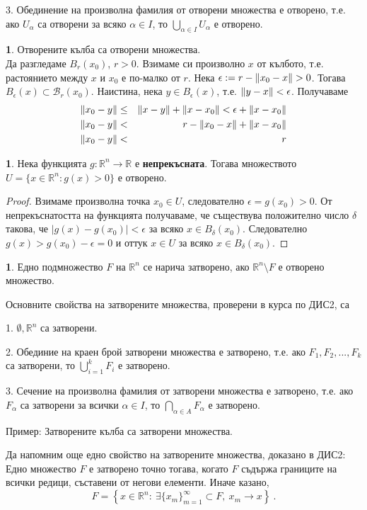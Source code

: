 \documentclass[11pt]{article}
\numberwithin{equation}{section}
\numberwithin{figure}{section}
\numberwithin{table}{section}
\theoremstyle{plain}
\theoremstyle{definition}
\newtheorem{defn}[thm]{\protect\definitionname}
\theoremstyle{remark}
\theoremstyle{definition}
\theoremstyle{remark}
\theoremstyle{plain}
\theoremstyle{definition}
\theoremstyle{definition}
\newtheorem{example}[thm]{\protect\examplename}
\theoremstyle{plain}
\theoremstyle{plain}
\theoremstyle{plain}
\theoremstyle{definition}
\theoremstyle{plain}
\providecommand{\definitionname}{Дефиниция}
\providecommand{\examplename}{Пример}
\DeclarePairedDelimiter\norm{\lVert}{\rVert}
\newcommand*{\B}{\mathcal{B}}
\newcommand*{\R}{\mathbb{R}}
\begin{document}
3. Обединение на произволна фамилия от отворени множества е отворено, т.е. ако $U_\alpha$ са отворени за всяко $\alpha \in I$, то $\bigcup _{\alpha \in I} U_\alpha$ е отворено.

\begin{example}
Отворените кълба са отворени множества.\\
Да разгледаме $B_r(x_0)$, $r>0$. Взимаме си произволно $x$ от кълбото, т.е. растоянието между $x$ и $x_0$ е по-малко от $r$. Нека $\epsilon := r - \norm{x_0-x}>0$. Тогава $B_\epsilon(x)\subset\B_r(x_0)$. Наистина, нека $y\in B_\epsilon(x)$, т.е. $\norm{y-x} <\epsilon$. Получаваме
\begin{eqnarray*}
\norm{x_0-y} &\leq& \norm{x-y} + \norm{x-x_0} < \epsilon + \norm{x-x_0}\\
\norm{x_0-y} &<& r - \norm{x_0-x} + \norm{x-x_0}\\
\norm{x_0-y} &<& r
\end{eqnarray*}
\end{example}

\begin{example}
Нека функцията  $g:\R^n \rightarrow \R$ е \textbf{непрекъсната}. Тогава множеството \\ $U = \{x\in\R^n:g(x)>0\}$ е отворено.
\begin{proof}
Взимаме произволна точка $x_0\in U$, следователно $\epsilon = g(x_0)>0$. От непрекъснатостта на функцията получаваме, че съществува положително число $\delta$ такова, че $|g(x)-g(x_0)|<\epsilon$ за всяко $x\in B_\delta(x_0)$. Следователно $g(x)>g(x_0)-\epsilon = 0$ и оттук $x \in U$ за всяко $x\in B_\delta(x_0)$.
\end{proof}
\end{example}

\begin{defn} Едно подмножество
$F$ на $\R^n $ се нарича затворено, ако $\R^n \setminus F$ е отворено множество.
\end{defn}

Основните свойства на затворените множества, проверени в курса по ДИС2, са

1. $\emptyset, \R^n$ са затворени.

2. Обединие на краен брой затворени множества е затворено, т.е. ако $F_1, F_2, ..., F_k$ са затворени, то $\bigcup_{i=1}^k F_i$ е затворено.

3. Сечение на произволна фамилия от затворени множества е затворено, т.е. ако $F_\alpha$ са затворени за всички $\alpha \in I$, то $\bigcap _{\alpha \in A} F_\alpha$ е затворено.


\noindent Пример: Затворените кълба са затворени множества.

Да напомним още едно свойство на затворените множества, доказано в ДИС2: Едно множество $F$ е затворено точно тогава, когато $F$ съдържа границите на всички редици, съставени от негови елементи. Иначе казано, 
$$F = \left\{ x\in \R^n : \ \exists \{x_m\}_{m=1}^\infty \subset F, \ x_m \rightarrow x \right\} \ .$$
\end{document}

